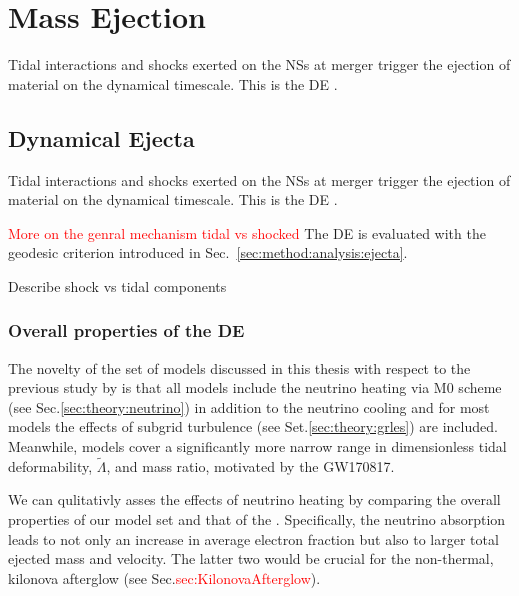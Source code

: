 \documentclass[11pt,a4paper,headinclude=true,DIV=14,BCOR=8mm,chapterprefix,listof=totoc,twoside,openright,abstracton]{scrbook}
\newcommand{\red}[1]{\textcolor{red}{#1}}
\newcommand{\GW}{GW170817}
\newcommand{\eg}{\textit{e.g.}}
\begin{document}
\section{Mass Ejection}



Tidal interactions and shocks exerted on the \acp{NS} at merger trigger the ejection of material
on the dynamical timescale. This is the \ac{DE} \citep[\eg][]{Hotokezaka:2013b,Bauswein:2013yna,Radice:2016dwd,Radice:2018pdn}. 



\subsection{Dynamical Ejecta}


Tidal interactions and shocks exerted on the \acp{NS} at merger trigger the ejection of material
on the dynamical timescale. This is the \ac{DE} \citep[\eg][]{Hotokezaka:2013b,Bauswein:2013yna,Radice:2016dwd,Radice:2018pdn}. 

\red{More on the genral mechanism tidal vs shocked}
The \ac{DE} is evaluated with the geodesic criterion introduced in Sec.~\ref{sec:method:analysis:ejecta}.

Describe shock vs tidal components 

\subsubsection{Overall properties of the \ac{DE}}


The novelty of the set of models discussed in this thesis with respect to the 
previous study by \citet{Radice:2018pdn} is that all models include the neutrino heating via M0 scheme 
(see Sec.\ref{sec:theory:neutrino}) in addition to the neutrino cooling and for most models the effects 
of subgrid turbulence (see Set.\ref{sec:theory:grles}) are included.
Meanwhile, models cover a significantly more narrow range in 
dimensionless tidal deformability, $\tilde{\Lambda}$, and mass ratio, motivated by the \GW{}.

We can qulitativly asses the effects of neutrino heating by comparing the overall properties 
of our model set and that of the \citet{Radice:2018pdn}.
Specifically, the neutrino absorption leads to not only an increase in average electron 
fraction but also to larger total ejected mass and velocity. The latter two would be 
crucial for the non-thermal, kilonova afterglow (see Sec.\red{sec:KilonovaAfterglow}).
\end{document}
